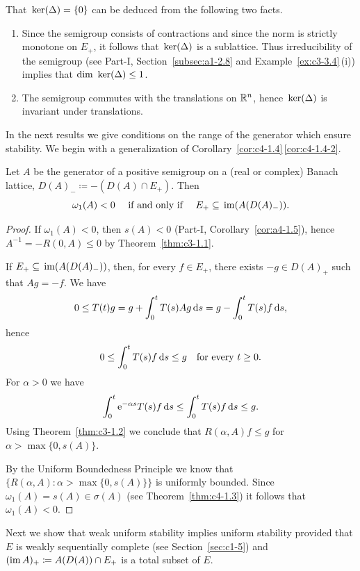 That $\mathop{}\mathrm{ker}(\Delta) = \{0\}$ can be deduced from the following two facts.
\begin{enumerate}[\upshape (i), wide, labelindent=.25em]
\item 
Since the semigroup consists of contractions and since the norm is strictly monotone on $E_{+}$, it follows that $\mathop{}\mathrm{ker}(\Delta)$ is a sublattice.
Thus irreducibility of the semigroup (see Part-I, Section~\ref{subsec:a1-2.8} and Example~\ref{ex:c3-3.4}\,(i)) implies that $\dim \Kern\Delta \leq 1$.

\item 
The semigroup commutes with the translations on $\mathbb{R}^{n}$, hence $\mathop{}\mathrm{ker}(\Delta)$ is invariant under translations.

\end{enumerate}
In the next results we give conditions on the range of the generator which ensure stability.
We begin with a generalization of Corollary~\ref{cor:c4-1.4}\,\ref{cor:c4-1.4-2}.
\begin{proposition}\label{prop:c4-1.6}
%
Let $A$ be the generator of a positive semigroup on a (real or complex) Banach lattice, $D(A)_{-} \coloneq -(D(A) \cap E_{+})$.
Then 
\[ 
\text{$\omega_{1}(A) < 0 $ \quad \text{if and only if} \quad $E_{+} \subseteq \mathop{}\mathrm{im}(A(D(A)_{-}))$.}
\]
\end{proposition}
\begin{proof}
If\/ $\omega_{1}(A) < 0$, then $s(A) < 0$ (Part-I, Corollary~\ref{cor:a4-1.5}), hence $A^{-1} = -R(0,A) \leq 0$ by Theorem~\ref{thm:c3-1.1}.

If\/ $E_{+} \subseteq \mathop{}\mathrm{im}(A(D(A)_{-}))$, then, for every $f \in E_{+}$, there exists $-g \in D(A)_{+}$ such that $Ag = -f$.
We have 
\[
0 \leq T(t)g = g + \int_{0}^{t} T(s)Ag \ds = g - \int_{0}^{t} T(s)f \ds,
\]
hence 
\[
0 \leq \int_{0}^{t} T(s)f \ds \leq g 
\quad \text{for every $t \geq 0$.}
\]
For $\alpha > 0$ we have 
\[
\int_{0}^{t} \eu^{-\alpha s}T(s)f \ds \leq \int_{0}^{t} T(s)f \ds \leq g .
\]
Using Theorem~\ref{thm:c3-1.2}  we conclude that $R(\alpha,A)f \leq g$ for $\alpha > \max\{0,s(A)\}$.

By the Uniform Boundedness Principle we know that $\{R(\alpha,A) \colon \alpha > \max\{0,s(A)\}\}$ is uniformly bounded.
Since $\omega_{1}(A) = s(A) \in \sigma(A)$ (see Theorem~\ref{thm:c4-1.3}) it follows that $\omega_{1}(A) < 0$.
\end{proof}
Next we show that weak uniform stability implies uniform stability provided that $E$ is weakly sequentially complete (see Section~\ref{sec:c1-5}) and $(\mathop{}\!\mathrm{im}\,{A})_{+} \coloneq A(D(A)) \cap E_{+}$ is a total subset of\/ $E$.
